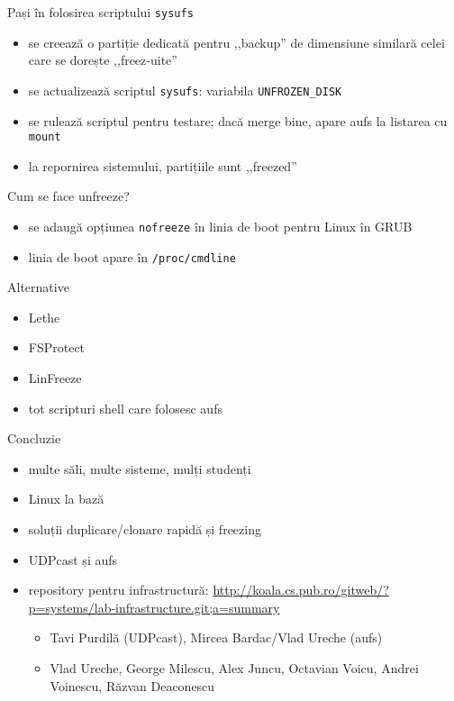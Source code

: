 \documentclass{beamer}
\begin{document}
\begin{frame}{Pași în folosirea scriptului \texttt{sysufs}}
  \begin{itemize}
    \item se creează o partiție dedicată pentru ,,backup'' de dimensiune
      similară celei care se dorește ,,freez-uite''
    \item se actualizează scriptul \texttt{sysufs}: variabila
      \texttt{UNFROZEN\_DISK}
    \item se rulează scriptul pentru testare; dacă merge bine, apare aufs la
      listarea cu \texttt{mount}
    \item la repornirea sistemului, partițiile sunt ,,freezed''
  \end{itemize}
\end{frame}

\begin{frame}{Cum se face unfreeze?}
  \begin{itemize}
    \item se adaugă opțiunea \texttt{nofreeze} în linia de boot pentru Linux
      în GRUB
    \item linia de boot apare în \texttt{/proc/cmdline}
  \end{itemize}
\end{frame}

\begin{frame}{Alternative}
  \begin{itemize}
    \item Lethe
    \item FSProtect
    \item LinFreeze
    \item tot scripturi shell care folosesc aufs
  \end{itemize}
\end{frame}

\begin{frame}{Concluzie}
  \begin{itemize}
    \item multe săli, multe sisteme, mulți studenți
    \item Linux la bază
    \item soluții duplicare/clonare rapidă și freezing
    \item UDPcast și aufs
    \item repository pentru infrastructură: \url{http://koala.cs.pub.ro/gitweb/?p=systems/lab-infrastructure.git;a=summary}
      \begin{itemize}
        \item Tavi Purdilă (UDPcast), Mircea Bardac/Vlad Ureche (aufs)
        \item Vlad Ureche, George Milescu, Alex Juncu, Octavian Voicu, Andrei
          Voinescu, Răzvan Deaconescu
      \end{itemize}
  \end{itemize}
\end{frame}
\end{document}
